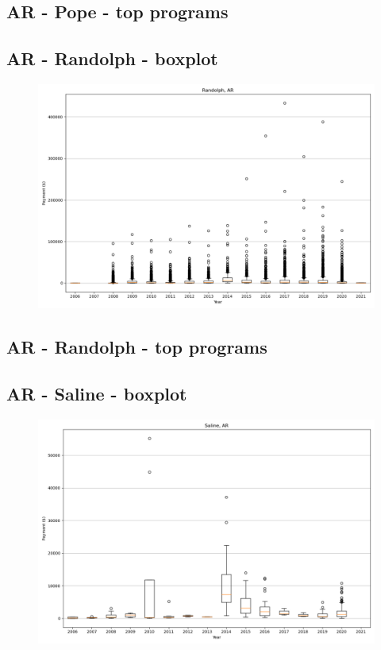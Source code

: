 \subsection*{AR - Pope - top programs}

\newpage
\subsection*{AR - Randolph - boxplot}
\begin{figure}[h]
\centering
\includegraphics[width=7in]{../output/boxplots/counties/Randolph-AR_boxplot.png}
\end{figure}


\subsection*{AR - Randolph - top programs}

\newpage
\subsection*{AR - Saline - boxplot}
\begin{figure}[h]
\centering
\includegraphics[width=7in]{../output/boxplots/counties/Saline-AR_boxplot.png}
\end{figure}


